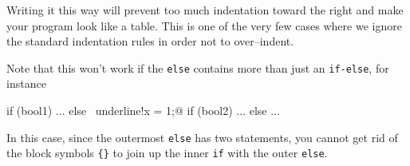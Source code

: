 Writing it this way will prevent too much indentation toward the 
right and make your program look like a table.
This is one of the very few cases where we ignore the standard
indentation rules in order not to over--indent.

Note that this won't work if the \verb!else! contains more than
just an \verb!if-else!, for instance
{\footnotesize
\begin{console}[commandchars=\~\!\@]
if (bool1)
{
   ...
}
else
{
    ~underline!x = 1;@
    if (bool2)
    {
        ...
    }
    else
    {
        ...
    }
}
\end{console}
}
In this case, since the outermost \verb!else! has two statements,
you cannot get rid of the block symbols \verb!{}! to join up the 
inner \verb!if! with the outer \verb!else!.
